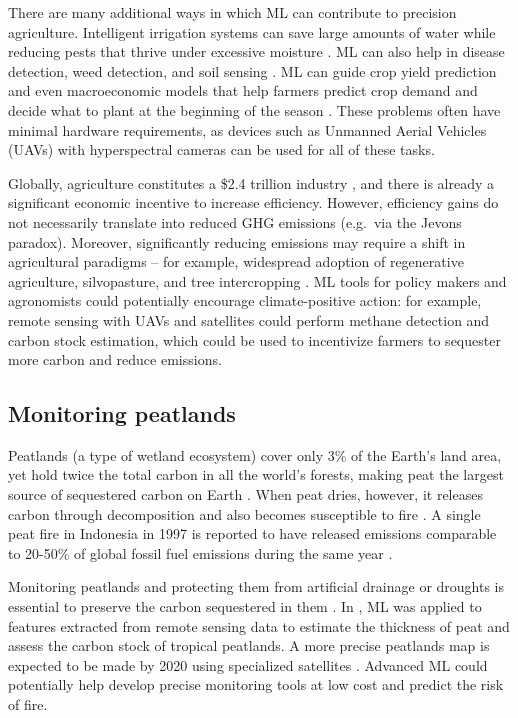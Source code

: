 \documentclass[11pt]{report}
\newcommand{\Gap}{\texorpdfstring{\hfill}{}}
\newcommand{\Rec}{\texorpdfstring{{\small\emph{\color{blue}{\fbox{High Leverage}}}}}{}}
\begin{document}
There are many additional ways in which ML can contribute to precision agriculture. Intelligent irrigation systems can save large amounts of water while reducing pests that thrive under excessive moisture \cite{hawken2017drawdown}. ML can also help in disease detection, weed detection, and soil sensing \cite{wahabzada2016plant, liakos2018machine, rossel2016soil}. ML can guide crop yield prediction \cite{you2017deep} and even macroeconomic models that help farmers predict crop demand and decide what to plant at the beginning of the season \cite{ma2019interpretable}. These problems often have minimal hardware requirements, as devices such as Unmanned Aerial Vehicles (UAVs) with hyperspectral cameras can be used for all of these tasks.

Globally, agriculture constitutes a \$2.4 trillion industry \cite{agricultureTrillionIndustry}, and there is already a significant economic incentive to increase efficiency. However, efficiency gains do not necessarily translate into reduced GHG emissions (e.g.~via the Jevons paradox). Moreover, significantly reducing emissions may require a shift in agricultural paradigms -- for example, widespread adoption of regenerative agriculture, silvopasture, and tree intercropping \cite{hawken2017drawdown}. ML tools for policy makers and agronomists \cite{agronomy9030142} could potentially encourage climate-positive action: for example, remote sensing with UAVs and satellites could perform methane detection and carbon stock estimation, which could be used to incentivize farmers to sequester more carbon and reduce emissions. 

\subsection{Monitoring peatlands\Gap\Rec}\label{sec:peatlands}
Peatlands (a type of wetland ecosystem) cover only 3\% of the Earth's land area, yet hold twice the total carbon in all the world's forests, making peat the largest source of sequestered carbon on Earth \cite{parish2008assessment}. When peat dries, however, it releases carbon through decomposition and also becomes susceptible to fire \cite{parish2008assessment,peatfire}. A single peat fire in Indonesia in 1997 is reported to have released emissions comparable to 20-50\% of global fossil fuel emissions during the same year \cite{page2002amount}. 

Monitoring peatlands and protecting them from artificial drainage or droughts is essential to preserve the carbon sequestered in them \cite{joosten2012peatlands, holden2004artificial}. In \cite{minasny2018open}, ML was applied to features extracted from remote sensing data to estimate the thickness of peat and assess the carbon stock of tropical peatlands. A more precise peatlands map is expected to be made by 2020 using specialized satellites \cite{peatlandMap}. Advanced ML could potentially help develop precise monitoring tools at low cost and predict the risk of fire.
\end{document}
